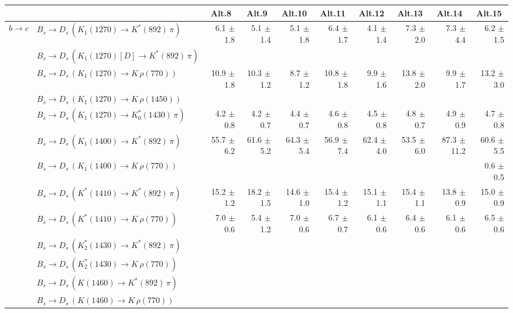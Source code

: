 \begin{tabular}{l l  r  r  r  r  r  r  r  r  } 
\hline
\hline
&  & \multicolumn{1}{c}{Alt.8}  & \multicolumn{1}{c}{Alt.9}  & \multicolumn{1}{c}{Alt.10}  & \multicolumn{1}{c}{Alt.11}  & \multicolumn{1}{c}{Alt.12}  & \multicolumn{1}{c}{Alt.13}  & \multicolumn{1}{c}{Alt.14}  & \multicolumn{1}{c}{Alt.15}  \\ 
\hline
\multirow{32}{*}{$b \to c$}  & $B_s \to D_s \, ( K_1(1270) \to K^{*}(892) \, \pi )$ & 6.1 $\pm$ 1.8 & 5.1 $\pm$ 1.4 & 5.1 $\pm$ 1.8 & 6.4 $\pm$ 1.7 & 4.1 $\pm$ 1.4 & 7.3 $\pm$ 2.0 & 7.3 $\pm$ 4.4 & 6.2 $\pm$ 1.5 \\ 
 & $B_s \to D_s \, ( K_1(1270)[D] \to K^{*}(892) \, \pi )$ &  &  &  &  &  &  &  &  \\ 
 & $B_s \to D_s \, ( K_1(1270) \to K \, \rho(770) )$ & 10.9 $\pm$ 1.8 & 10.3 $\pm$ 1.2 & 8.7 $\pm$ 1.2 & 10.8 $\pm$ 1.8 & 9.9 $\pm$ 1.6 & 13.8 $\pm$ 2.0 & 9.9 $\pm$ 1.7 & 13.2 $\pm$ 3.0 \\ 
 & $B_s \to D_s \, ( K_1(1270) \to K \, \rho(1450) )$ &  &  &  &  &  &  &  &  \\ 
 & $B_s \to D_s \, ( K_1(1270) \to K^{*}_{0}(1430) \, \pi )$ & 4.2 $\pm$ 0.8 & 4.2 $\pm$ 0.7 & 4.4 $\pm$ 0.7 & 4.6 $\pm$ 0.8 & 4.5 $\pm$ 0.8 & 4.8 $\pm$ 0.7 & 4.9 $\pm$ 0.9 & 4.7 $\pm$ 0.8 \\ 
 & $B_s \to D_s \, ( K_1(1400) \to K^{*}(892) \, \pi )$ & 55.7 $\pm$ 6.2 & 61.6 $\pm$ 5.2 & 64.3 $\pm$ 5.4 & 56.9 $\pm$ 7.4 & 62.4 $\pm$ 4.0 & 53.5 $\pm$ 6.0 & 87.3 $\pm$ 11.2 & 60.6 $\pm$ 5.5 \\ 
 & $B_s \to D_s \, ( K_1(1400) \to K \, \rho(770) )$ &  &  &  &  &  &  &  & 0.6 $\pm$ 0.5 \\ 
 & $B_s \to D_s \, ( K^{*}(1410) \to K^{*}(892) \, \pi )$ & 15.2 $\pm$ 1.2 & 18.2 $\pm$ 1.5 & 14.6 $\pm$ 1.0 & 15.4 $\pm$ 1.2 & 15.1 $\pm$ 1.1 & 15.4 $\pm$ 1.1 & 13.8 $\pm$ 0.9 & 15.0 $\pm$ 0.9 \\ 
 & $B_s \to D_s \, ( K^{*}(1410) \to K \, \rho(770) )$ & 7.0 $\pm$ 0.6 & 5.4 $\pm$ 1.2 & 7.0 $\pm$ 0.6 & 6.7 $\pm$ 0.7 & 6.1 $\pm$ 0.6 & 6.4 $\pm$ 0.6 & 6.1 $\pm$ 0.6 & 6.5 $\pm$ 0.6 \\ 
 & $B_s \to D_s \, ( K_2^{*}(1430) \to K^{*}(892) \, \pi )$ &  &  &  &  &  &  &  &  \\ 
 & $B_s \to D_s \, ( K_2^{*}(1430) \to K \, \rho(770) )$ &  &  &  &  &  &  &  &  \\ 
 & $B_s \to D_s \, ( K(1460) \to K^{*}(892) \, \pi )$ &  &  &  &  &  &  &  &  \\ 
 & $B_s \to D_s \, ( K(1460) \to K \, \rho(770) )$ &  &  &  &  &  &  &  &  \\ 

\end{tabular}
